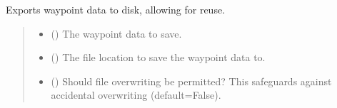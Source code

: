 \documentclass[letterpaper,10pt,english]{sphinxmanual}
\begin{document}
\begin{fulllineitems}
\label{\detokenize{modules/waypoints/generation:qnav.waypoints.generation.save_waypoints}}
\pysigstartsignatures
{}
\pysigstopsignatures
\sphinxAtStartPar
Exports waypoint data to disk, allowing for reuse.
\begin{quote}\begin{description}
\begin{itemize}
\item {} 
\sphinxAtStartPar
{} () \textendash{} The waypoint data to save.

\item {} 
\sphinxAtStartPar
{} () \textendash{} The file location to save the waypoint data to.

\item {} 
\sphinxAtStartPar
{} () \textendash{} Should file overwriting be permitted? This
safeguards against accidental overwriting (default=False).

\end{itemize}

\end{description}\end{quote}

\end{fulllineitems}

\end{document}
